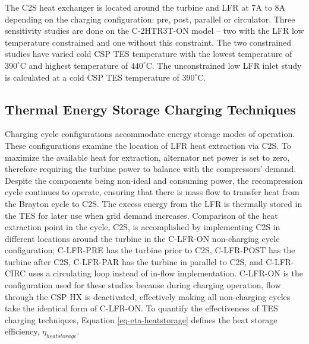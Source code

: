 \begin{paracol}{2}
\linenumbers
\switchcolumn

The C2S heat exchanger is located around the turbine and LFR at 7A to 8A depending on the charging configuration: pre, post, parallel or circulator. Three sensitivity studies are done on the C-2HTR3T-ON model -- two with the LFR low temperature constrained and one without this constraint. The two constrained studies have varied cold CSP TES temperature with the lowest temperature of $390^{\circ}$C and highest temperature of $440^{\circ}$C. The unconstrained low LFR inlet study is calculated at a cold CSP TES temperature of $390^{\circ}$C.  



\subsection{Thermal Energy Storage Charging Techniques} 

Charging cycle configurations accommodate energy storage modes of operation. These configurations examine the location of LFR heat extraction via C2S. To maximize the available heat for extraction, alternator net power is set to zero, therefore requiring the turbine power to balance with the compressors' demand. Despite the components being non-ideal and consuming power, the recompression cycle continues to operate, ensuring that there is mass flow to transfer heat from the Brayton cycle to C2S. The excess energy from the LFR is thermally stored in the TES for later use when grid demand increases. Comparison of the heat extraction point in the cycle, C2S, is accomplished by implementing C2S in different locations around the turbine in the C-LFR-ON non-charging cycle configuration; C-LFR-PRE has the turbine prior to C2S, C-LFR-POST has the turbine after C2S, C-LFR-PAR has the turbine in parallel to C2S, and C-LFR-CIRC uses a circulating loop instead of in-flow implementation. C-LFR-ON is the configuration used for these studies because during charging operation, flow through the CSP HX is deactivated, effectively making all non-charging cycles take the identical form of C-LFR-ON. To quantify the effectiveness of TES charging techniques, Equation \ref{eq-eta-heatstorage} defines the heat storage efficiency, $\eta_{heatstorage}$.  


\end{paracol}
